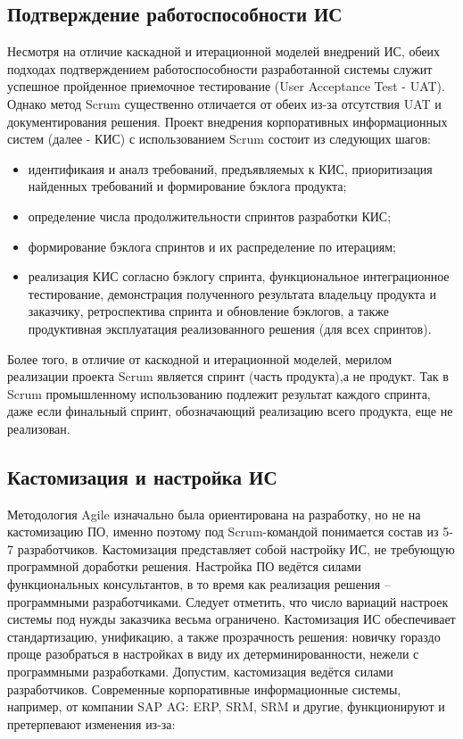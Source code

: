 \documentclass[12pt]{article}
\begin{document}
\subsection{Подтверждение работоспособности ИС}

Несмотря на отличие каскадной и итерационной моделей внедрений ИС, обеих подходах подтверждением 
работоспособности разработанной системы служит успешное пройденное приемочное тестирование (User Acceptance Test - UAT)\cite{InfoSysImplementation}. 
Однако метод Scrum существенно отличается от обеих из-за отсутствия UAT и документирования решения. Проект 
внедрения корпоративных информационных систем (далее - КИС) с использованием Scrum состоит из следующих шагов:

\begin{itemize}
\item идентификаия и аналз требований, предъявляемых к КИС, приоритизация найденных требований и формирование бэклога продукта;
\item определение числа продолжительности спринтов разработки КИС;
\item формирование бэклога спринтов и их распределение по итерациям;
\item реализация КИС согласно бэклогу спринта, функциональное интеграционное тестирование, демонстрация 
полученного результата владельцу продукта и заказчику, ретроспектива спринта и обновление бэклогов, а также
продуктивная эксплуатация реализованного решения (для всех спринтов\cite{AgilePrinciples}).
\end{itemize}

Более того, в отличие от каскодной и итерационной моделей, мерилом реализации проекта Scrum является спринт (часть продукта),а не продукт.
Так в Scrum промышленному использованию подлежит результат каждого спринта, даже если финальный спринт, обозначающий 
реализацию всего продукта, еще не реализован.

\subsection{Кастомизация и настройка ИС}

Методология Agile изначально была ориентирована на разработку, но не на кастомизацию ПО, 
именно поэтому под Scrum-командой понимается состав из 5-7 разработчиков. Кастомизация 
представляет собой настройку ИС, не требующую программной доработки решения. Настройка ПО 
ведётся силами функциональных консультантов, в то время как реализация решения – программными
разработчиками. Следует отметить, что число вариаций настроек системы под нужды заказчика 
весьма ограничено. Кастомизация ИС обеспечивает стандартизацию, унификацию, а также прозрачность 
решения: новичку гораздо проще разобраться в настройках в виду их детерминированности, нежели с 
программными разработками. Допустим, кастомизация ведётся силами разработчиков. Современные 
корпоративные информационные системы, например, от компании SAP AG: ERP, SRM, SRM и другие,
функционируют и претерпевают изменения из-за:
\end{document}
